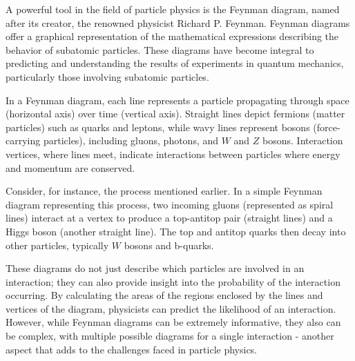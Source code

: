 A powerful tool in the field of particle physics is the Feynman diagram, named after its creator, the renowned physicist
Richard P. Feynman. Feynman diagrams offer a graphical representation of the mathematical expressions describing the
behavior of subatomic particles. These diagrams have become integral to predicting and understanding the results of
experiments in quantum mechanics, particularly those involving subatomic particles.

In a Feynman diagram, each line represents a particle propagating through space (horizontal axis) over time (vertical
axis). Straight lines depict fermions (matter particles) such as quarks and leptons, while wavy lines represent bosons
(force-carrying particles), including gluons, photons, and $W$ and $Z$ bosons. Interaction vertices, where lines meet,
indicate interactions between particles where energy and momentum are conserved.

Consider, for instance, the \tth process mentioned earlier. In a simple Feynman diagram representing this process, two
incoming gluons (represented as spiral lines) interact at a vertex to produce a top-antitop pair (straight lines) and a
Higgs boson (another straight line). The top and antitop quarks then decay into other particles, typically $W$ bosons and
b-quarks.

These diagrams do not just describe which particles are involved in an interaction; they can also provide insight into
the probability of the interaction occurring. By calculating the areas of the regions enclosed by the lines and vertices
of the diagram, physicists can predict the likelihood of an interaction. However, while Feynman diagrams can be
extremely informative, they also can be complex, with multiple possible diagrams for a single interaction - another
aspect that adds to the challenges faced in particle physics.